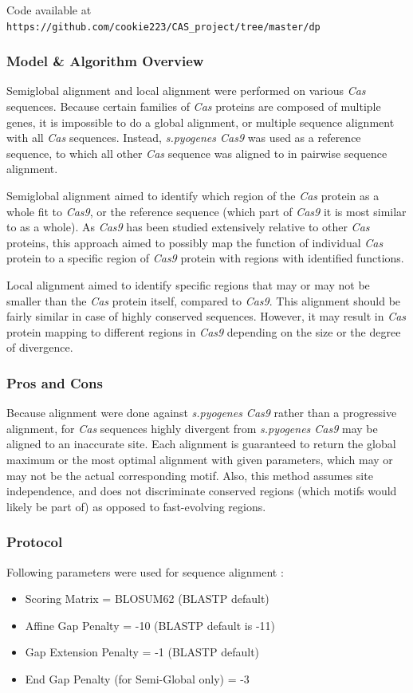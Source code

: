 \documentclass[11pt, oneside]{article}
\begin{document}
Code available at \texttt{https://github.com/cookie223/CAS\_project/tree/master/dp}


\subsubsection{Model \& Algorithm Overview}

Semiglobal alignment and local alignment were performed on various \textit{Cas} sequences. Because certain families of \textit{Cas} proteins are composed of multiple genes, it is impossible to do a global alignment, or multiple sequence alignment with all \textit{Cas} sequences. Instead, \textit{s.pyogenes Cas9} was used as a reference sequence, to which all other \textit{Cas} sequence was aligned to in pairwise sequence alignment. 

Semiglobal alignment aimed to identify which region of the \textit{Cas} protein as a whole fit to \textit{Cas9}, or the reference sequence (which part of \textit{Cas9} it is most similar to as a whole). As \textit{Cas9} has been studied extensively relative to other \textit{Cas} proteins, this approach aimed to possibly map the function of individual \textit{Cas} protein to a specific region of \textit{Cas9} protein with regions with identified functions. 

Local alignment aimed to identify specific regions that may or may not be smaller than the \textit{Cas} protein itself, compared to \textit{Cas9}. This alignment should be fairly similar in case of highly conserved sequences. However, it may result in \textit{Cas} protein mapping to different regions in \textit{Cas9} depending on the size or the degree of divergence. 

\subsubsection{Pros and Cons}

Because alignment were done against \textit{s.pyogenes Cas9} rather than a progressive alignment, for \textit{Cas} sequences highly divergent from \textit{s.pyogenes Cas9} may be aligned to an inaccurate site. Each alignment is guaranteed to return the global maximum or the most optimal alignment with given parameters, which may or may not be the actual corresponding motif. Also, this method assumes site independence, and does not discriminate conserved regions (which motifs would likely be part of) as opposed to fast-evolving regions. 


\subsubsection{Protocol} 
Following parameters were used for sequence alignment :
\begin{itemize}
\item Scoring Matrix = BLOSUM62 (BLASTP default)
\item Affine Gap Penalty = -10 (BLASTP default is -11)
\item Gap Extension Penalty = -1 (BLASTP default)
\item End Gap Penalty (for Semi-Global only) = -3
\end{itemize}
\end{document}
